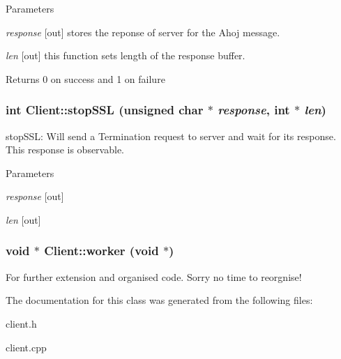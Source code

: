 \begin{DoxyParams}{Parameters}
\item[{\em response}]\mbox{[}out\mbox{]} stores the reponse of server for the Ahoj message. \item[{\em len}]\mbox{[}out\mbox{]} this function sets length of the response buffer.\end{DoxyParams}
\begin{DoxyReturn}{Returns}
0 on success and 1 on failure 
\end{DoxyReturn}
\hypertarget{classClient_afcd814d5ed81c40cba7e8098b887ef29}{
\subsubsection[{stopSSL}]{\setlength{\rightskip}{0pt plus 5cm}int Client::stopSSL (unsigned char $\ast$ {\em response}, \/  int $\ast$ {\em len})}}
\label{classClient_afcd814d5ed81c40cba7e8098b887ef29}
stopSSL: Will send a Termination request to server and wait for its response. This response is observable. 
\begin{DoxyParams}{Parameters}
\item[{\em response}]\mbox{[}out\mbox{]} \item[{\em len}]\mbox{[}out\mbox{]} \end{DoxyParams}
\hypertarget{classClient_a77b4af68238cc619103711603de95cdf}{
\subsubsection[{worker}]{\setlength{\rightskip}{0pt plus 5cm}void $\ast$ Client::worker (void $\ast$)}}
\label{classClient_a77b4af68238cc619103711603de95cdf}
For further extension and organised code. Sorry no time to reorgnise! 

The documentation for this class was generated from the following files:\begin{DoxyCompactItemize}
\item 
client.h\item 
client.cpp\end{DoxyCompactItemize}
